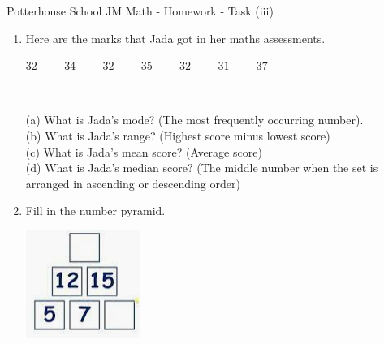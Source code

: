 \documentclass{article}
\date{}
\begin{document}
\fontsize{12}{13} \selectfont %

\begin{center}
Potterhouse School \hspace{3cm} JM Math - Homework - Task (iii)  
\end{center}

\begin{enumerate}

\item \quad Here are the marks that Jada got in her maths assessments.

\begin{center}
\( \displaystyle 32 \hspace{1cm} 34 \hspace{1cm} 32 \hspace{1cm} 35 \hspace{1cm} 32 \hspace{1cm} 31 \hspace{1cm} 37 \)  
\end{center}

\\

\begin{flushleft}

(a) What is Jada's mode? (The most frequently occurring number). \vspace{5pt} \\ 
(b) What is Jada's range? (Highest score minus lowest score)  \vspace{5pt} \\
(c) What is Jada's mean score? (Average score) \vspace{5pt} \\
(d) What is Jada's median score? (The middle number when the set is arranged in ascending or descending order) \vspace{5pt} \\

\end{flushleft}

\item \quad Fill in the number pyramid.

\begin{center}
    \includegraphics{Year_6_Mixed_Tests/Homework_Tasks/Addition_pyramid_1.png}
\end{center}


\end{enumerate}
\end{document}
